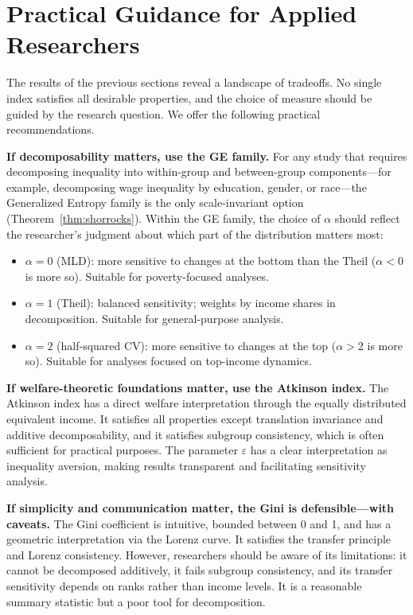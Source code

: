\documentclass[12pt]{article}
\theoremstyle{plain}
\theoremstyle{definition}
\theoremstyle{remark}
\begin{document}
\section{Practical Guidance for Applied Researchers}\label{sec:guidance}

The results of the previous sections reveal a landscape of tradeoffs.
No single index satisfies all desirable properties, and the choice of measure should be guided by the research question.
We offer the following practical recommendations.

\textbf{If decomposability matters, use the GE family.}
For any study that requires decomposing inequality into within-group and between-group components---for example, decomposing wage inequality by education, gender, or race---the Generalized Entropy family is the only scale-invariant option (Theorem~\ref{thm:shorrocks}).
Within the GE family, the choice of $\alpha$ should reflect the researcher's judgment about which part of the distribution matters most:
\begin{itemize}
    \item $\alpha = 0$ (MLD): more sensitive to changes at the bottom than the Theil ($\alpha < 0$ is more so). Suitable for poverty-focused analyses.
    \item $\alpha = 1$ (Theil): balanced sensitivity; weights by income shares in decomposition. Suitable for general-purpose analysis.
    \item $\alpha = 2$ (half-squared CV): more sensitive to changes at the top ($\alpha > 2$ is more so). Suitable for analyses focused on top-income dynamics.
\end{itemize}

\textbf{If welfare-theoretic foundations matter, use the Atkinson index.}
The Atkinson index has a direct welfare interpretation through the equally distributed equivalent income.
It satisfies all properties except translation invariance and additive decomposability, and it satisfies subgroup consistency, which is often sufficient for practical purposes.
The parameter $\varepsilon$ has a clear interpretation as inequality aversion, making results transparent and facilitating sensitivity analysis.

\textbf{If simplicity and communication matter, the Gini is defensible---with caveats.}
The Gini coefficient is intuitive, bounded between 0 and 1, and has a geometric interpretation via the Lorenz curve.
It satisfies the transfer principle and Lorenz consistency.
However, researchers should be aware of its limitations: it cannot be decomposed additively, it fails subgroup consistency, and its transfer sensitivity depends on ranks rather than income levels.
It is a reasonable summary statistic but a poor tool for decomposition.
\end{document}
